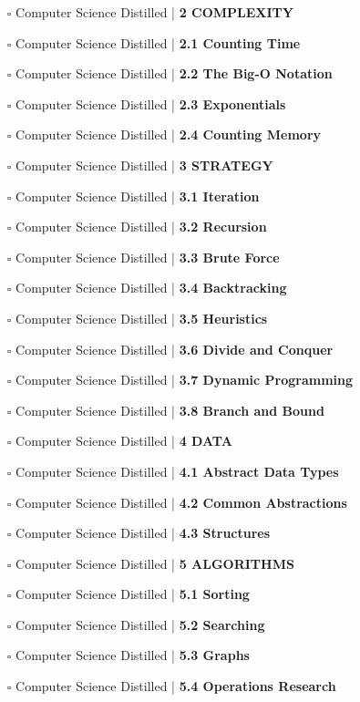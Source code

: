 \documentclass[a4, landscape, 12pt]{article}
\newcommand{\checkbox}{$\square$}%
\begin{document}
\begin{itemize}
{}
\item [\checkbox]  Computer Science Distilled | \textbf{ 2 COMPLEXITY
}
\item [\checkbox]  Computer Science Distilled | \textbf{ 2.1 Counting Time
}
\item [\checkbox]  Computer Science Distilled | \textbf{ 2.2 The Big-O Notation
}
\item [\checkbox]  Computer Science Distilled | \textbf{ 2.3 Exponentials
}
\item [\checkbox]  Computer Science Distilled | \textbf{ 2.4 Counting Memory
}
\item [\checkbox]  Computer Science Distilled | \textbf{ 3 STRATEGY
}
\item [\checkbox]  Computer Science Distilled | \textbf{ 3.1 Iteration
}
\item [\checkbox]  Computer Science Distilled | \textbf{ 3.2 Recursion
}
\item [\checkbox]  Computer Science Distilled | \textbf{ 3.3 Brute Force
}
\item [\checkbox]  Computer Science Distilled | \textbf{ 3.4 Backtracking
}
\item [\checkbox]  Computer Science Distilled | \textbf{ 3.5 Heuristics
}
\item [\checkbox]  Computer Science Distilled | \textbf{ 3.6 Divide and Conquer
}
\item [\checkbox]  Computer Science Distilled | \textbf{ 3.7 Dynamic Programming
}
\item [\checkbox]  Computer Science Distilled | \textbf{ 3.8 Branch and Bound
}
\item [\checkbox]  Computer Science Distilled | \textbf{ 4 DATA
}
\item [\checkbox]  Computer Science Distilled | \textbf{ 4.1 Abstract Data Types
}
\item [\checkbox]  Computer Science Distilled | \textbf{ 4.2 Common Abstractions
}
\item [\checkbox]  Computer Science Distilled | \textbf{ 4.3 Structures
}
\item [\checkbox]  Computer Science Distilled | \textbf{ 5 ALGORITHMS
}
\item [\checkbox]  Computer Science Distilled | \textbf{ 5.1 Sorting
}
\item [\checkbox]  Computer Science Distilled | \textbf{ 5.2 Searching
}
\item [\checkbox]  Computer Science Distilled | \textbf{ 5.3 Graphs
}
\item [\checkbox]  Computer Science Distilled | \textbf{ 5.4 Operations Research
}
\end{itemize}
\end{document}
